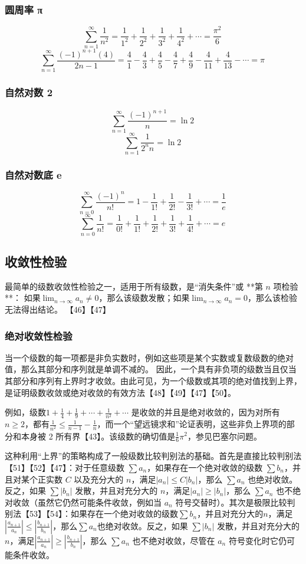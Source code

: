 \subsubsection{圆周率 π}
$$
\sum_{n=1}^{\infty}\frac{1}{n^{2}}=\frac{1}{1^{2}}+\frac{1}{2^{2}}+\frac{1}{3^{2}}+\frac{1}{4^{2}}+\cdots = \frac{\pi^{2}}{6}~
$$
$$
\sum_{n=1}^{\infty}\frac{(-1)^{n+1}(4)}{2n-1}=\frac{4}{1}-\frac{4}{3}+\frac{4}{5}-\frac{4}{7}+\frac{4}{9}-\frac{4}{11}+\frac{4}{13}-\cdots = \pi~
$$
\subsubsection{自然对数 2}
$$
\sum_{n=1}^{\infty}\frac{(-1)^{n+1}}{n}=\ln 2~
$$
$$
\sum_{n=1}^{\infty}\frac{1}{2^{n}n}=\ln 2~
$$
\subsubsection{自然对数底 e}
$$
\sum_{n=0}^{\infty}\frac{(-1)^{n}}{n!}=1-\frac{1}{1!}+\frac{1}{2!}-\frac{1}{3!}+\cdots = \frac{1}{e}~
$$
$$
\sum_{n=0}^{\infty}\frac{1}{n!}=\frac{1}{0!}+\frac{1}{1!}+\frac{1}{2!}+\frac{1}{3!}+\frac{1}{4!}+\cdots = e~
$$
\subsection{收敛性检验}
最简单的级数收敛性检验之一，适用于所有级数，是“消失条件”或 **第 $n$ 项检验**：
如果$\lim_{n \to \infty} a_{n} \neq 0$，那么该级数发散；如果$\lim_{n \to \infty} a_{n} = 0$，那么该检验无法得出结论。 【46】【47】
\subsubsection{绝对收敛性检验}
当一个级数的每一项都是非负实数时，例如这些项是某个实数或复数级数的绝对值，那么其部分和序列就是单调不减的。 因此，一个具有非负项的级数当且仅当其部分和序列有上界时才收敛。由此可见，为一个级数或其项的绝对值找到上界，是证明级数收敛或绝对收敛的有效方法【48】【49】【47】【50】。

例如，级数$1+\frac{1}{4}+\frac{1}{9}+\cdots+\frac{1}{n^{2}}+\cdots$
是收敛的并且是绝对收敛的，因为对所有 $n \geq 2$，都有$\frac{1}{n^{2}}\leq \frac{1}{n-1}-\frac{1}{n}$，而一个“望远镜求和”论证表明，这些非负上界项的部分和本身被 2 所有界【43】。该级数的确切值是$\frac{1}{6}\pi^{2}$，参见巴塞尔问题。

这种利用“上界”的策略构成了一般级数比较判别法的基础。首先是直接比较判别法【51】【52】【47】：对于任意级数 $\sum a_{n}$，如果存在一个绝对收敛的级数 $\sum b_{n}$，并且对某个正实数 $C$ 以及充分大的 $n$，满足$|a_{n}| \leq C|b_{n}|$，那么 $\sum a_{n}$ 也绝对收敛。反之，如果 $\sum |b_{n}|$ 发散，并且对充分大的 $n$，满足$|a_{n}| \geq |b_{n}|$，那么 $\sum a_{n}$ 也不绝对收敛（虽然它仍然可能条件收敛，例如当 $a_{n}$ 符号交替时）。其次是极限比较判别法【53】【54】：如果存在一个绝对收敛的级数$\sum b_{n}$，并且对充分大的$n$，满足$\left|\frac{a_{n+1}}{a_{n}}\right| \leq \left|\frac{b_{n+1}}{b_{n}}\right|$，那么$\sum a_{n}$也绝对收敛。反之，如果 $\sum |b_{n}|$ 发散，并且对充分大的 $n$，满足$\left|\frac{a_{n+1}}{a_{n}}\right| \geq \left|\frac{b_{n+1}}{b_{n}}\right|$，那么 $\sum a_{n}$ 也不绝对收敛，尽管在 $a_{n}$ 符号变化时它仍可能条件收敛。

